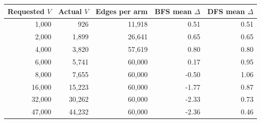 \begin{center}\small
\begin{tabular}{rrrrr}\toprule
Requested $V$ & Actual $V$ & Edges per arm & BFS mean $\Delta$ & DFS mean $\Delta$ \\\midrule
1,000 & 926 & 11,918 & 0.51 & 0.51 \\
2,000 & 1,899 & 26,641 & 0.65 & 0.65 \\
4,000 & 3,820 & 57,619 & 0.80 & 0.80 \\
6,000 & 5,741 & 60,000 & 0.17 & 0.95 \\
8,000 & 7,655 & 60,000 & -0.50 & 1.06 \\
16,000 & 15,223 & 60,000 & -1.77 & 0.87 \\
32,000 & 30,262 & 60,000 & -2.33 & 0.73 \\
47,000 & 44,232 & 60,000 & -2.36 & 0.46 \\
\bottomrule\end{tabular}
\end{center}
